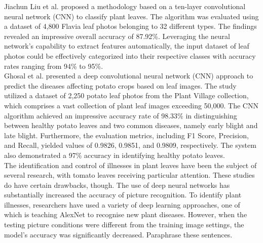 \documentclass[conference]{IEEEtran}
\begin{document}
Jiachun Liu et al. \cite{8623427} proposed a methodology based on a ten-layer convolutional neural network (CNN) to classify plant leaves. The algorithm was evaluated using a dataset of 4,800 Flavia leaf photos belonging to 32 different types. The findings revealed an impressive overall accuracy of 87.92\%. Leveraging the neural network's capability to extract features automatically, the input dataset of leaf photos could be effectively categorized into their respective classes with accuracy rates ranging from 94\% to 95\%. \\

Ghosal et al. \cite{9106423} presented a deep convolutional neural network (CNN) approach to predict the diseases affecting potato crops based on leaf images. The study utilized a dataset of 2,250 potato leaf photos from the Plant Village collection, which comprises a vast collection of plant leaf images exceeding 50,000. The CNN algorithm achieved an impressive accuracy rate of 98.33\% in distinguishing between healthy potato leaves and two common diseases, namely early blight and late blight. Furthermore, the evaluation metrics, including F1 Score, Precision, and Recall, yielded values of 0.9826, 0.9851, and 0.9809, respectively. The system also demonstrated a 97\% accuracy in identifying healthy potato leaves.\\

The identification and control of illnesses in plant leaves have been the subject of several research, with tomato leaves receiving particular attention. These studies \cite{9048207} do have certain drawbacks, though. The use of deep neural networks has substantially increased the accuracy of picture recognition. To identify plant illnesses, researchers have used a variety of deep learning approaches, one of which is teaching AlexNet to recognise new plant diseases. However, when the testing picture conditions were different from the training image settings, the model's accuracy was significantly decreased. Paraphrase these sentences.\\
\end{document}
